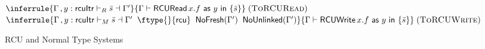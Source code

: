 \begin{figure*}
\scriptsize{
\medskip
$
\inferrule
{
\Gamma\, , y : \textsf{rcuItr} \vdash_R \bar{s} \dashv \Gamma'
}
{
\Gamma \vdash \textsf{RCURead}\, x.f \textsf{ as }y\textsf{ in }\{\bar{s}\}
}
\;(\textsc{ToRCURead})
$
\medskip
$
\inferrule
{
 \Gamma\, , y : \textsf{rcuItr} \vdash_M \bar{s} \dashv \Gamma' \;\; \ftype{}{\textsf{rcu}} \;\;  \textsf{NoFresh}(\Gamma') \;\; \textsf{NoUnlinked}(\Gamma')
}
{
\Gamma \vdash \textsf{RCUWrite}\, x.f \textsf{ as }y\textsf{ in } \{ \bar{s} \}
}
\;(\textsc{ToRCUWrite})
$
\medskip
}
\caption{RCU and Normal Type Systems}
\label{fig:transitionsbetweendifferenttypesystems}
\end{figure*}






































